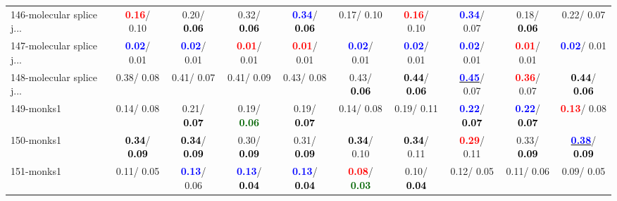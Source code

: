 \begin{table}[h]
\begin{center}
{\begin{tabular}{lc|c|c|c|c|c|c|c|c}
146-molecular splice j... & \textcolor{red}{\textbf{  0.16}}/  0.10 &   0.20/\textcolor{black}{\textbf{  0.06}} &   0.32/\textcolor{black}{\textbf{  0.06}} & \textcolor{blue}{\textbf{  0.34}}/\textcolor{black}{\textbf{  0.06}} &   0.17/  0.10 & \textcolor{red}{\textbf{  0.16}}/  0.10 & \textcolor{blue}{\textbf{  0.34}}/  0.07 &   0.18/\textcolor{black}{\textbf{  0.06}} &   0.22/  0.07 \\
147-molecular splice j... & \textcolor{blue}{\textbf{  0.02}}/  0.01 & \textcolor{blue}{\textbf{  0.02}}/  0.01 & \textcolor{red}{\textbf{  0.01}}/  0.01 & \textcolor{red}{\textbf{  0.01}}/  0.01 & \textcolor{blue}{\textbf{  0.02}}/  0.01 & \textcolor{blue}{\textbf{  0.02}}/  0.01 & \textcolor{blue}{\textbf{  0.02}}/  0.01 & \textcolor{red}{\textbf{  0.01}}/  0.01 & \textcolor{blue}{\textbf{  0.02}}/  0.01 \\
148-molecular splice j... &   0.38/  0.08 &   0.41/  0.07 &   0.41/  0.09 &   0.43/  0.08 &   0.43/\textcolor{black}{\textbf{  0.06}} & \textcolor{black}{\textbf{  0.44}}/\textcolor{black}{\textbf{  0.06}} & \underline{\textcolor{blue}{\textbf{  0.45}}}/  0.07 & \textcolor{red}{\textbf{  0.36}}/  0.07 & \textcolor{black}{\textbf{  0.44}}/\textcolor{black}{\textbf{  0.06}} \\
149-monks1 &   0.14/  0.08 &   0.21/\textcolor{black}{\textbf{  0.07}} &   0.19/\textcolor{darkgreen}{\textbf{  0.06}} &   0.19/\textcolor{black}{\textbf{  0.07}} &   0.14/  0.08 &   0.19/  0.11 & \textcolor{blue}{\textbf{  0.22}}/\textcolor{black}{\textbf{  0.07}} & \textcolor{blue}{\textbf{  0.22}}/\textcolor{black}{\textbf{  0.07}} & \textcolor{red}{\textbf{  0.13}}/  0.08 \\ \hline
150-monks1 & \textcolor{black}{\textbf{  0.34}}/\textcolor{black}{\textbf{  0.09}} & \textcolor{black}{\textbf{  0.34}}/\textcolor{black}{\textbf{  0.09}} &   0.30/\textcolor{black}{\textbf{  0.09}} &   0.31/\textcolor{black}{\textbf{  0.09}} & \textcolor{black}{\textbf{  0.34}}/  0.10 & \textcolor{black}{\textbf{  0.34}}/  0.11 & \textcolor{red}{\textbf{  0.29}}/  0.11 &   0.33/\textcolor{black}{\textbf{  0.09}} & \underline{\textcolor{blue}{\textbf{  0.38}}}/\textcolor{black}{\textbf{  0.09}} \\
151-monks1 &   0.11/  0.05 & \textcolor{blue}{\textbf{  0.13}}/  0.06 & \textcolor{blue}{\textbf{  0.13}}/\textcolor{black}{\textbf{  0.04}} & \textcolor{blue}{\textbf{  0.13}}/\textcolor{black}{\textbf{  0.04}} & \textcolor{red}{\textbf{  0.08}}/\textcolor{darkgreen}{\textbf{  0.03}} &   0.10/\textcolor{black}{\textbf{  0.04}} &   0.12/  0.05 &   0.11/  0.06 &   0.09/  0.05 \\

\end{tabular}}
\end{center}
\end{table}
